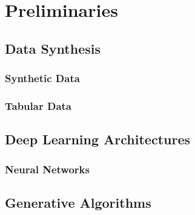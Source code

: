 \chapter{Preliminaries}
\label{ch:preliminaries}

\section{Data Synthesis}
\label{ch:preliminaries-dataSynthesis}

\subsection{Synthetic Data}
\label{ch:preliminaries-dataSynthesis-syntheticData}


\subsection{Tabular Data}
\label{ch:preliminaries-dataSynthesis-tabularData}

\section{Deep Learning Architectures}
\label{ch:preliminaries-deepLearningArchitectures}

\subsection{Neural Networks}
\label{ch:preliminaries-deepLearningArchitectures-neuralNetworks}


\section{Generative Algorithms}
\label{ch:preliminaries-generativeAlgorithms}

